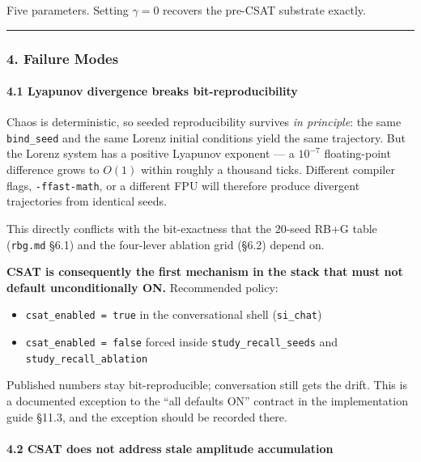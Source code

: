 \documentclass[
  11pt,
  a4paper,
]{article}
\providecommand{\tightlist}{%
  \setlength{\itemsep}{0pt}\setlength{\parskip}{0pt}}
\begin{document}
Five parameters. Setting \(\gamma = 0\) recovers the pre-CSAT substrate
exactly.

\begin{center}\rule{0.5\linewidth}{0.5pt}\end{center}

\subsubsection{4. Failure Modes}\label{failure-modes-4}

\paragraph{4.1 Lyapunov divergence breaks
bit-reproducibility}\label{lyapunov-divergence-breaks-bit-reproducibility}

Chaos is deterministic, so seeded reproducibility survives \emph{in
principle}: the same \texttt{bind\_seed} and the same Lorenz initial
conditions yield the same trajectory. But the Lorenz system has a
positive Lyapunov exponent --- a \(10^{-7}\) floating-point difference
grows to \(O(1)\) within roughly a thousand ticks. Different compiler
flags, \texttt{-ffast-math}, or a different FPU will therefore produce
divergent trajectories from identical seeds.

This directly conflicts with the bit-exactness that the 20-seed RB+G
table (\texttt{rbg.md} §6.1) and the four-lever ablation grid (§6.2)
depend on.

\textbf{CSAT is consequently the first mechanism in the stack that must
not default unconditionally ON.} Recommended policy:

\begin{itemize}
\tightlist
\item
  \texttt{csat\_enabled\ =\ true} in the conversational shell
  (\texttt{si\_chat})
\item
  \texttt{csat\_enabled\ =\ false} forced inside
  \texttt{study\_recall\_seeds} and \texttt{study\_recall\_ablation}
\end{itemize}

Published numbers stay bit-reproducible; conversation still gets the
drift. This is a documented exception to the ``all defaults ON''
contract in the implementation guide §11.3, and the exception should be
recorded there.

\paragraph{4.2 CSAT does not address stale amplitude
accumulation}\label{csat-does-not-address-stale-amplitude-accumulation}
\end{document}
